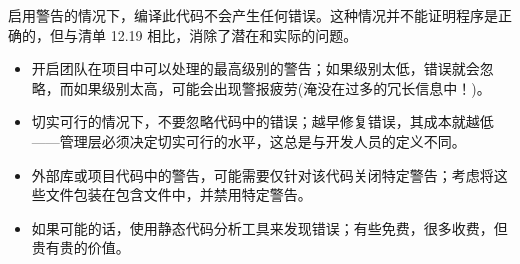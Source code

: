 启用警告的情况下，编译此代码不会产生任何错误。这种情况并不能证明程序是正确的，但与清单 12.19 相比，消除了潜在和实际的问题。


\begin{itemize}
\item
开启团队在项目中可以处理的最高级别的警告；如果级别太低，错误就会忽略，而如果级别太高，可能会出现警报疲劳(淹没在过多的冗长信息中！)。

\item
切实可行的情况下，不要忽略代码中的错误；越早修复错误，其成本就越低——管理层必须决定切实可行的水平，这总是与开发人员的定义不同。

\item
外部库或项目代码中的警告，可能需要仅针对该代码关闭特定警告；考虑将这些文件包装在包含文件中，并禁用特定警告。

\item
如果可能的话，使用静态代码分析工具来发现错误；有些免费，很多收费，但贵有贵的价值。
\end{itemize}

